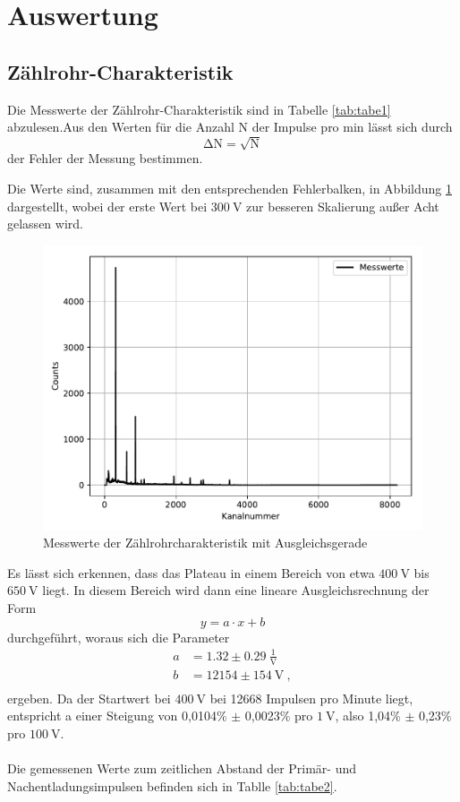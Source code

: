\section{Auswertung}
\subsection{Zählrohr-Charakteristik}
Die Messwerte der Zählrohr-Charakteristik sind in Tabelle \ref{tab:tabe1}
abzulesen.Aus den Werten für die Anzahl N der Impulse pro min lässt sich durch
\begin{equation}
  \increment\text{N}=\sqrt{\text{N}}
\end{equation}
der Fehler der Messung bestimmen.

Die Werte sind, zusammen mit den entsprechenden Fehlerbalken, in Abbildung \ref{fig:plot1}
dargestellt, wobei der erste Wert bei $\SI{300}{\volt}$ zur besseren Skalierung
außer Acht gelassen wird.
\begin{figure}[H]
  \centering
  \includegraphics{plot1.pdf}
  \caption{Messwerte der Zählrohrcharakteristik mit Ausgleichsgerade}
  \label{fig:plot1}
\end{figure}
Es lässt sich erkennen, dass das Plateau in einem Bereich von etwa $\SI{400}{\volt}$
bis $\SI{650}{\volt}$ liegt. In diesem Bereich wird dann eine lineare Ausgleichsrechnung
der Form
\begin{equation}
  y = a\cdot x +b
  \label{eqn:linear}
\end{equation}
durchgeführt, woraus sich die Parameter
\begin{align*}
  a &= 1.32 \pm 0.29 \: \frac{1}{\text{V}}\\
  b &= 12154 \pm 154 \: \text{V}\: ,\\
\end{align*}
ergeben.
Da der Startwert bei $\SI{400}{\volt}$ bei 12668 Impulsen pro Minute liegt,
entspricht a einer Steigung von 0,0104\% $\pm$ 0,0023\% pro $\SI{1}{\volt}$,
also 1,04\% $\pm$ 0,23\% pro $\SI{100}{\volt}$. \\
\\
Die gemessenen Werte zum zeitlichen Abstand der Primär- und Nachentladungsimpulsen
befinden sich in Tablle \ref{tab:tabe2}.


